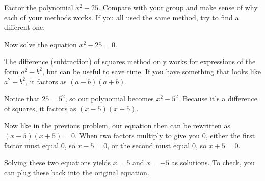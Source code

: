 \documentclass[noauthor]{ximera}
\begin{document}
\begin{problem}
Factor the polynomial \(x^2 - 25\). Compare with 
your group and make sense of why each of your methods
works. If you all used the same method, try to find
a different one.

Now solve the equation \(x^2 - 25 = 0\).

\begin{explanation}
The difference (subtraction) of squares method only works for expressions of the form \(a^2 - b^2\), but can be useful to save time. If you have
something that looks like \(a^2 - b^2\), it factors as \((a - b)(a + b)\).

Notice that \(25 = 5^2\), so our polynomial becomes \(x^2 - 5^2\). Because it's a difference of squares, it factors as \((x - 5)(x + 5)\).\

Now like in the previous problem, our equation then can be rewritten as \((x - 5)(x + 5) = 0\). When two factors multiply to give you \(0\), 
either the first factor must equal \(0\), so \(x - 5 = 0\), or the second must equal \(0\), so \(x + 5 = 0\). 

Solving these two equations yields \(x = 5\) and \(x = -5\) as solutions. To check, you can plug these back into the original equation.


\end{explanation}
\end{problem}
\end{document}
